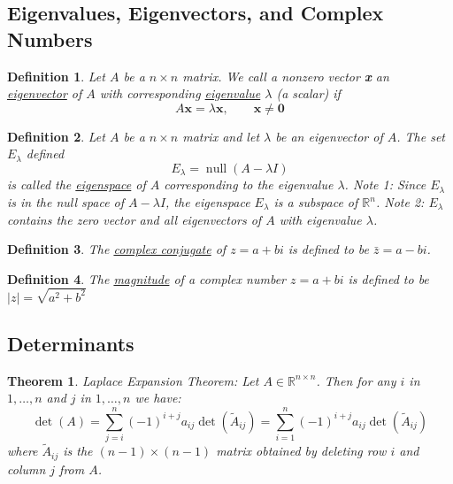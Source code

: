 \documentclass{article}
\theoremstyle{definitionstyle}
\newtheorem{definition}{Definition}[section]
\newtheorem{theorem}{Theorem}[section]
\begin{document}
\subsection{Eigenvalues, Eigenvectors, and Complex Numbers}

\begin{definition}
    Let $A$ be a $n \times n$ matrix. We call a nonzero vector \textbf{x} an \underline{eigenvector} of $A$ with
    corresponding \underline{eigenvalue} $\lambda$ (a scalar) if
    \begin{equation*}
        A\mathbf{x} = \lambda \mathbf{x}, \qquad \mathbf{x} \ne \mathbf{0}
    \end{equation*}
\end{definition}

\begin{definition}
    Let $A$ be a $n \times n$ matrix and let $\lambda$ be an eigenvector of $A$. The set $E_\lambda$ defined
    \begin{equation*}
        E_\lambda = \operatorname*{null}(A-\lambda I)
    \end{equation*}
    is called the \underline{eigenspace} of $A$ corresponding to the eigenvalue $\lambda$.
    \newline
    \textit{Note 1:} Since $E_\lambda$ is in the null space of $A - \lambda I$, the eigenspace $E_\lambda$ is a subspace of $\mathbb{R}^n$.
    \newline
    \textit{Note 2:} $E_\lambda$ contains the zero vector and all eigenvectors of $A$ with eigenvalue $\lambda$.
\end{definition}

\begin{definition}
    The \underline{complex conjugate} of $z=a+bi$ is defined to be $\bar{z}=a-bi$.
\end{definition}

\begin{definition}
    The \underline{magnitude} of a complex number $z=a+bi$ is defined to be $|z| = \sqrt{a^2 + b^2}$
\end{definition}

\subsection{Determinants}

\begin{theorem}
    \textit{Laplace Expansion Theorem:} Let $A \in \mathbb{R}^{n \times n}$. Then for any $i$ in $1,\dots,n$ and $j$ in $1,\dots,n$ we have:
    \begin{equation*}
        \det(A)=\sum_{j=i}^{n}{(-1)}^{i+j}a_{ij}\det(\tilde{A}_{ij})=\sum_{i=1}^{n}{(-1)}^{i+j}a_{ij}\det(\tilde{A}_{ij})
    \end{equation*}
    where $\tilde{A}_{ij}$ is the $(n - 1) \times (n-1)$ matrix obtained by deleting row $i$ and column $j$ from $A$.
\end{theorem}
\end{document}
